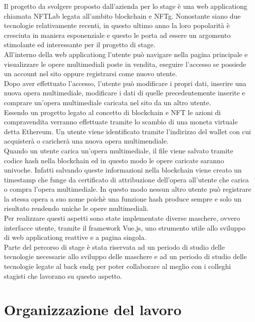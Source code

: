 Il progetto da svolgere proposto dall'azienda per lo stage è una \gls{web applicationg} chiamata NFTLab legata all'ambito blockchain e \gls{NFTg}. Nonostante siano due tecnologie relativamente recenti, in questo ultimo anno la loro popolarità è cresciuta in maniera esponenziale e questo le porta ad essere un argomento stimolante ed interessante per il progetto di stage.\\
All'interno della \gls{web applicationg} l'utente può navigare nella pagina principale e visualizzare le opere multimediali poste in vendita, eseguire l'accesso se possiede un account nel sito oppure registrarsi come nuovo utente.\\
Dopo aver effettuato l'accesso, l'utente può modificare i propri dati, inserire una nuova opera multimediale, modificare i dati di quelle precedentemente inserite e comprare un'opera multimediale caricata nel sito da un altro utente.\\
Essendo un progetto legato al concetto di blockchain e \gls{NFT} le azioni di compravendita verranno effettuate tramite lo scambio di una moneta virtuale detta Ethereum. Un utente viene identificato tramite l'indirizzo del wallet con cui acquisterà o caricherà una nuova opera multimendiale.\\
Quando un utente carica un'opera multimediale, il file viene salvato tramite codice hash nella blockchain ed in questo modo le opere caricate saranno univoche. Infatti salvando queste informazioni nella blockchain viene creato un timestamp che funge da certificato di attribuzione dell'opera all'utente che carica o compra l'opera multimediale. In questo modo nessun altro utente può registrare la stessa opera a suo nome poichè una funzione hash produce sempre e solo un risultato rendendo uniche le opere multimediali.\\
Per realizzare questi aspetti sono state implementate diverse maschere, ovvero interfacce utente, tramite il framework Vue.js, uno strumento utile allo sviluppo di \gls{web applicationg} reattive e a pagina singola.\\
Parte del percorso di stage è stata riservata ad un periodo di studio delle tecnologie necessarie allo sviluppo delle maschere e ad un periodo di studio delle tecnologie legate al \gls{back endg} per poter collaborare al meglio con i colleghi stagisti che lavorano su questo aspetto.

\section{Organizzazione del lavoro}
\label{sec:organizzazione-lavoro}


